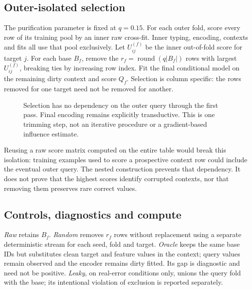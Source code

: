 \subsection{Outer-isolated selection}
The purification parameter is fixed at $q=0.15$. For each outer fold, score
every row of its training pool by an inner raw cross-fit. Inner typing,
encoding, contexts and fits all use that pool exclusively. Let $U^{(f)}_{ij}$
be the inner out-of-fold score for target $j$. For each base $B_f$, remove
the $r_f=\operatorname{round}(q|B_f|)$ rows with largest $U^{(f)}_{ij}$,
breaking ties by increasing row index. Fit the final conditional model on
the remaining dirty context and score $Q_f$. Selection is column specific:
the rows removed for one target need not be removed for another.

\begin{figure}[t]
\centering
{}
\caption{Selection has no dependency on the outer query through the first pass.
Final encoding remains explicitly transductive. This is one trimming step,
not an iterative procedure or a gradient-based influence estimate.}
\label{fig:algorithm}
\end{figure}

Reusing a raw score matrix computed on the entire table would break this
isolation: training examples used to score a prospective context row could
include the eventual outer query. The nested construction prevents that
dependency. It does not prove that the highest scores identify corrupted
contexts, nor that removing them preserves rare correct values.

\subsection{Controls, diagnostics and compute}
\emph{Raw} retains $B_f$. \emph{Random} removes $r_f$ rows without replacement
using a separate deterministic stream for each seed, fold and target.
\emph{Oracle} keeps the same base IDs but substitutes clean target and feature
values in the context; query values remain observed and the encoder remains
dirty fitted. Its gap is diagnostic and need not be positive.
\emph{Leaky}, on real-error conditions only, unions the query fold with the base;
its intentional violation of exclusion is reported separately.

